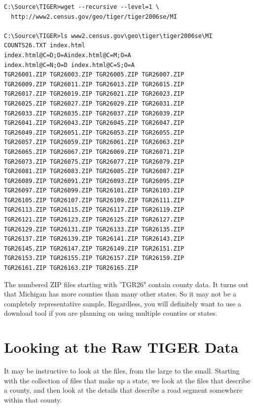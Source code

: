 \documentclass[11pt,letterpaper,onecolumn,twoside,openright,draft]{report}
\begin{document}
\begin{verbatim}
C:\Source\TIGER>wget --recursive --level=1 \
  http://www2.census.gov/geo/tiger/tiger2006se/MI

C:\Source\TIGER>ls www2.census.gov\geo\tiger\tiger2006se\MI
COUNTS26.TXT index.html
index.html@C=D;O=Aindex.html@C=M;O=A
index.html@C=N;O=D index.html@C=S;O=A
TGR26001.ZIP TGR26003.ZIP TGR26005.ZIP TGR26007.ZIP
TGR26009.ZIP TGR26011.ZIP TGR26013.ZIP TGR26015.ZIP
TGR26017.ZIP TGR26019.ZIP TGR26021.ZIP TGR26023.ZIP
TGR26025.ZIP TGR26027.ZIP TGR26029.ZIP TGR26031.ZIP
TGR26033.ZIP TGR26035.ZIP TGR26037.ZIP TGR26039.ZIP
TGR26041.ZIP TGR26043.ZIP TGR26045.ZIP TGR26047.ZIP
TGR26049.ZIP TGR26051.ZIP TGR26053.ZIP TGR26055.ZIP
TGR26057.ZIP TGR26059.ZIP TGR26061.ZIP TGR26063.ZIP
TGR26065.ZIP TGR26067.ZIP TGR26069.ZIP TGR26071.ZIP
TGR26073.ZIP TGR26075.ZIP TGR26077.ZIP TGR26079.ZIP
TGR26081.ZIP TGR26083.ZIP TGR26085.ZIP TGR26087.ZIP
TGR26089.ZIP TGR26091.ZIP TGR26093.ZIP TGR26095.ZIP
TGR26097.ZIP TGR26099.ZIP TGR26101.ZIP TGR26103.ZIP
TGR26105.ZIP TGR26107.ZIP TGR26109.ZIP TGR26111.ZIP
TGR26113.ZIP TGR26115.ZIP TGR26117.ZIP TGR26119.ZIP
TGR26121.ZIP TGR26123.ZIP TGR26125.ZIP TGR26127.ZIP
TGR26129.ZIP TGR26131.ZIP TGR26133.ZIP TGR26135.ZIP
TGR26137.ZIP TGR26139.ZIP TGR26141.ZIP TGR26143.ZIP
TGR26145.ZIP TGR26147.ZIP TGR26149.ZIP TGR26151.ZIP
TGR26153.ZIP TGR26155.ZIP TGR26157.ZIP TGR26159.ZIP
TGR26161.ZIP TGR26163.ZIP TGR26165.ZIP
\end{verbatim}


The numbered ZIP files starting with 'TGR26" contain county data.
It turns out that Michigan has more counties than many other states.
So it may not be a completely representative sample.
Regardless, you will definitely want to use a download tool if you are planning on using multiple counties or states.

\section{Looking at the Raw TIGER Data}
It may be instructive to look at the files, from the large to the small.
Starting with the collection of files that make up a state, we look at the files that describe a county, and then look at the details that describe a road segment somewhere within that county.
\end{document}
